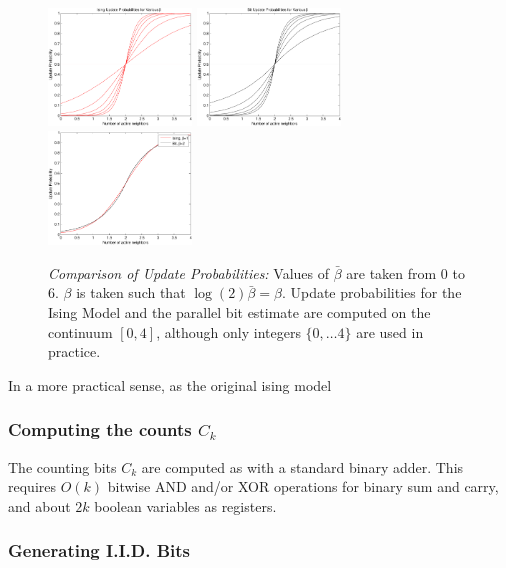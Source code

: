 \begin{figure}
\includegraphics[width=1.5in]{Parallel_Bits/isingup}
\includegraphics[width=1.5in]{Parallel_Bits/bitup}
\includegraphics[width=1.5in]{Parallel_Bits/parcompare}
\caption{\emph{Comparison of Update Probabilities:} 
Values of $\bar\beta$ are taken from 0 to 6.  $\beta$ is taken such that
$\log(2)\bar\beta = \beta$.  Update probabilities for the Ising Model and
the parallel bit estimate are computed on the continuum $[0,4]$, 
although only integers $\{0, \ldots 4\}$ are used in practice.\label{fig: parcompare}}
\end{figure}

In a more practical sense, as the original ising model

\subsubsection{Computing the counts $C_k$}

The counting bits $C_k$ are computed as with a standard binary adder.  
This requires $O(k)$ bitwise AND and/or XOR operations for binary sum and carry,
and about $2k$ boolean variables as registers.

\subsubsection{Generating I.I.D. Bits}

